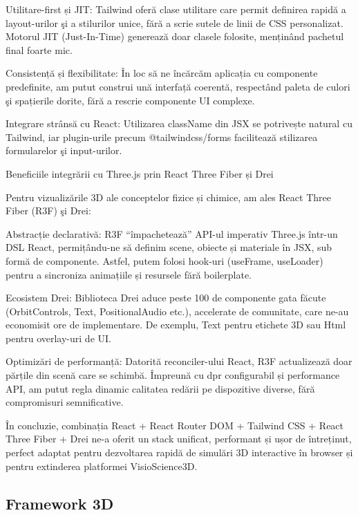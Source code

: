 Utilitare-first și JIT: Tailwind oferă clase utilitare care permit definirea rapidă a 
layout-urilor şi a stilurilor unice, fără a scrie sutele de linii de CSS personalizat. Motorul 
JIT (Just-In-Time) generează doar clasele folosite, menținând pachetul final foarte mic.

Consistență și flexibilitate: În loc să ne încărcăm aplicația cu componente predefinite,
 am putut construi ună interfață coerentă, respectând paleta de culori şi spațierile dorite,
  fără a rescrie componente UI complexe.

Integrare strânsă cu React: Utilizarea className din JSX se potrivește natural cu Tailwind,
 iar plugin-urile precum @tailwindcss/forms facilitează stilizarea formularelor şi input-urilor.

Beneficiile integrării cu Three.js prin React Three Fiber și Drei

Pentru vizualizările 3D ale conceptelor fizice și chimice, am ales React Three Fiber (R3F) şi Drei:

Abstracție declarativă: R3F “împachetează” API-ul imperativ Three.js într-un DSL React, 
permițându-ne să definim scene, obiecte și materiale în JSX, sub formă de componente. 
Astfel, putem folosi hook-uri (useFrame, useLoader) pentru a sincroniza animațiile și 
resursele fără boilerplate.

Ecosistem Drei: Biblioteca Drei aduce peste 100 de componente gata făcute (OrbitControls,
 Text, PositionalAudio etc.), accelerate de comunitate, care ne-au economisit ore de 
 implementare. De exemplu, Text pentru etichete 3D sau Html pentru overlay-uri de UI.

Optimizări de performanță: Datorită reconciler-ului React, R3F actualizează doar părțile
 din scenă care se schimbă. Împreună cu dpr configurabil și performance API, am putut regla
  dinamic calitatea redării pe dispozitive diverse, fără compromisuri semnificative.

În concluzie, combinația React + React Router DOM + Tailwind CSS + React Three Fiber + 
Drei ne-a oferit un stack unificat, performant și ușor de întreținut, perfect adaptat 
pentru dezvoltarea rapidă de simulări 3D interactive în browser și pentru extinderea
platformei VisioScience3D.


\subsection{Framework 3D}

